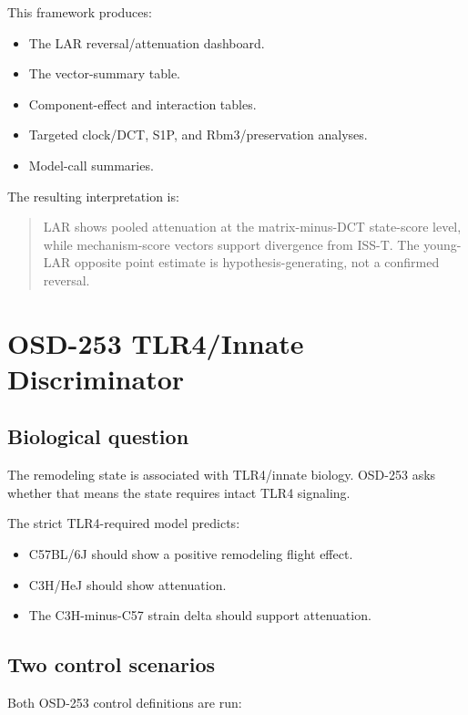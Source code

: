 \documentclass[11pt]{article}
\begin{document}
This framework produces:

\begin{itemize}
  \item The LAR reversal/attenuation dashboard.
  \item The vector-summary table.
  \item Component-effect and interaction tables.
  \item Targeted clock/DCT, S1P, and Rbm3/preservation analyses.
  \item Model-call summaries.
\end{itemize}

The resulting interpretation is:

\begin{quote}
LAR shows pooled attenuation at the matrix-minus-DCT state-score level, while mechanism-score vectors support divergence from ISS-T. The young-LAR opposite point estimate is hypothesis-generating, not a confirmed reversal.
\end{quote}

\section{OSD-253 TLR4/Innate Discriminator}

\subsection{Biological question}

The remodeling state is associated with TLR4/innate biology. OSD-253 asks whether that means the state requires intact TLR4 signaling.

The strict TLR4-required model predicts:

\begin{itemize}
  \item C57BL/6J should show a positive remodeling flight effect.
  \item C3H/HeJ should show attenuation.
  \item The C3H-minus-C57 strain delta should support attenuation.
\end{itemize}

\subsection{Two control scenarios}

Both OSD-253 control definitions are run:
\end{document}
